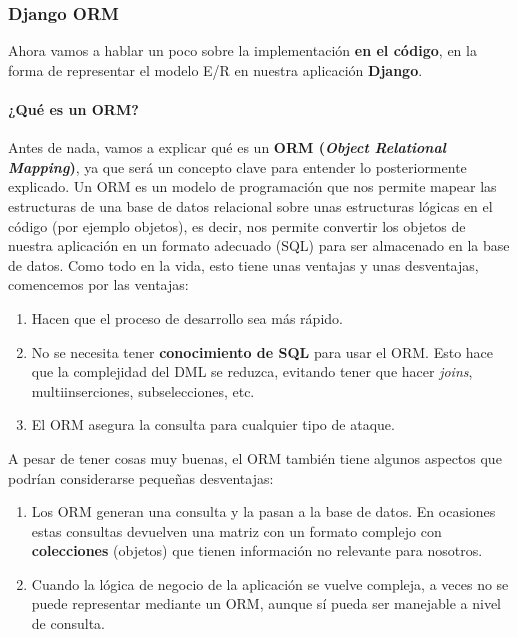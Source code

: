     \subsubsection{Django ORM}

    Ahora vamos a hablar un poco sobre la implementación \textbf{en el código}, en la forma
    de representar el modelo E/R en nuestra aplicación \textbf{Django}.\\

    \paragraph{¿Qué es un ORM?} \underline{}                                            
    \newline Antes de nada, vamos a explicar qué es un \textbf{ORM (\textit{Object Relational
    Mapping})}, ya que será un concepto clave para entender lo posteriormente explicado. Un ORM
    es un modelo de programación que nos permite mapear las estructuras de una base de datos
    relacional sobre unas estructuras lógicas en el código (por ejemplo objetos), es decir, nos
    permite convertir los objetos de nuestra aplicación en un formato adecuado (SQL) para ser
    almacenado en la base de datos. Como todo en la vida, esto tiene unas ventajas y unas
    desventajas, comencemos por las ventajas:

        \begin{enumerate}
            \item Hacen que el proceso de desarrollo sea más rápido.
            \item No se necesita tener \textbf{conocimiento de SQL} para usar el ORM. Esto
            hace que la complejidad del DML se reduzca, evitando tener que hacer
            \textit{joins}, multiinserciones, subselecciones, etc.
            \item El ORM asegura la consulta para cualquier tipo de ataque.
        \end{enumerate}

    A pesar de tener cosas muy buenas, el ORM también tiene algunos aspectos que podrían
    considerarse pequeñas desventajas:

        \begin{enumerate}
            \item Los ORM generan una consulta y la pasan a la base de datos. En ocasiones
            estas consultas devuelven una matriz con un formato complejo con
            \textbf{colecciones} (objetos) que tienen información no relevante para nosotros.
            \item Cuando la lógica de negocio de la aplicación se vuelve compleja, a veces
            no se puede representar mediante un ORM, aunque sí pueda ser manejable a nivel
            de consulta.
        \end{enumerate}

